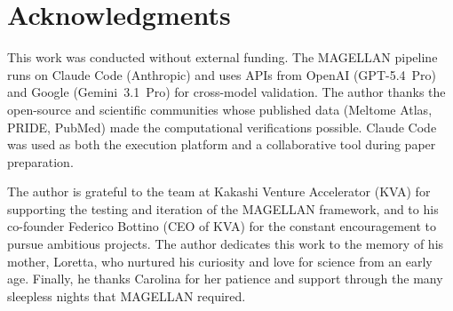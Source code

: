 \documentclass[11pt]{article}
\begin{document}





\section*{Acknowledgments}

This work was conducted without external funding. The MAGELLAN pipeline runs on Claude Code (Anthropic) and uses APIs from OpenAI (GPT-5.4~Pro) and Google (Gemini~3.1~Pro) for cross-model validation. The author thanks the open-source and scientific communities whose published data (Meltome Atlas, PRIDE, PubMed) made the computational verifications possible. Claude Code was used as both the execution platform and a collaborative tool during paper preparation.

The author is grateful to the team at Kakashi Venture Accelerator (KVA) for supporting the testing and iteration of the MAGELLAN framework, and to his co-founder Federico Bottino (CEO of KVA) for the constant encouragement to pursue ambitious projects. The author dedicates this work to the memory of his mother, Loretta, who nurtured his curiosity and love for science from an early age. Finally, he thanks Carolina for her patience and support through the many sleepless nights that MAGELLAN required.
\end{document}
